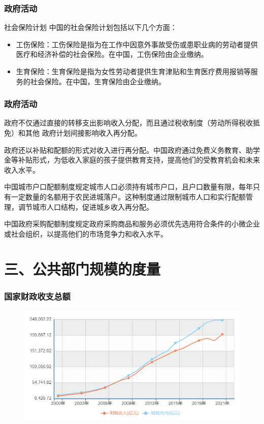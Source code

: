 \documentclass[aspectratio=169, 12pt]{beamer}
\begin{document}
\begin{frame}[plain]
    \frametitle{政府活动}
    \begin{block}{社会保险计划}
        中国的社会保险计划包括以下几个方面：
        \begin{itemize}
            \item 工伤保险：工伤保险是指为在工作中因意外事故受伤或患职业病的劳动者提供医疗和经济补偿的社会保险。在中国，工伤保险由企业缴纳。
            \item 生育保险：生育保险是指为女性劳动者提供生育津贴和生育医疗费用报销等服务的社会保险。在中国，生育保险由企业缴纳。
        \end{itemize}
    \end{block}
\end{frame}

\begin{frame}[plain]
    \frametitle{政府活动}
        政府不仅通过直接的转移支出影响收入分配，而且通过税收制度（劳动所得税收抵免）和其他
        政府计划间接影响收入再分配。\par
    政府还以补贴和配额的形式对收入进行再分配。中国政府通过免费义务教育、助学金等补贴形式，为低收入家庭的孩子提供教育支持，提高他们的受教育机会和未来收入水平。
    \par
    中国城市户口配额制度规定城市人口必须持有城市户口，且户口数量有限，每年只有一定数量的名额用于农民进城落户。这种制度通过限制城市人口和实行配额管理，调节城市人口结构，促进城乡收入再分配。
    \par
    中国政府采购配额制度规定政府采购商品和服务必须优先选用符合条件的小微企业或社会组织，以提高他们的市场竞争力和收入水平。
\end{frame}

\section{三、公共部门规模的度量}

\begin{frame}[plain]
    \frametitle{国家财政收支总额}
    \begin{figure}
        \centering
        \includegraphics[width=1.0\textwidth]{./resources/figure/finance.png}
    \end{figure}
\end{frame}
\end{document}

